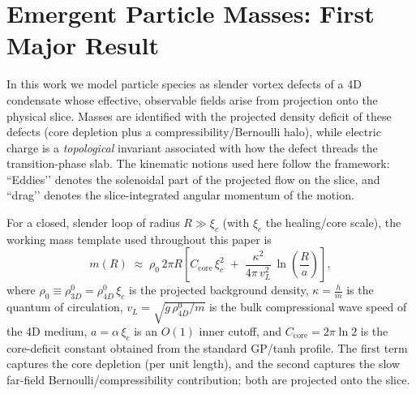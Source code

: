 \section{Emergent Particle Masses: First Major Result}\label{sec:emergent-particles}

\medskip

In this work we model particle species as slender vortex defects of a 4D condensate whose effective, observable fields arise from projection onto the physical slice. Masses are identified with the projected density deficit of these defects (core depletion plus a compressibility/Bernoulli halo), while electric charge is a \emph{topological} invariant associated with how the defect threads the transition-phase slab. The kinematic notions used here follow the framework: “Eddies’’ denotes the solenoidal part of the projected flow on the slice, and “drag’’ denotes the slice-integrated angular momentum of the motion.

For a closed, slender loop of radius $R\gg\xi_c$ (with $\xi_c$ the healing/core scale), the working mass template used throughout this paper is
\begin{equation}
\label{eq:mass-template}
m(R)\;\approx\;\rho_0\,2\pi R\left[
C_{\mathrm{core}}\,\xi_c^2\;+\;\frac{\kappa^2}{4\pi\,v_L^2}\,
\ln\!\left(\frac{R}{a}\right)\right],
\end{equation}
where $\rho_0\equiv \rho_{3D}^0=\rho_{4D}^0\,\xi_c$ is the projected background density, $\kappa=\frac{h}{m}$ is the quantum of circulation, $v_L=\sqrt{g\,\rho_{4D}^0/m}$ is the bulk compressional wave speed of the 4D medium, $a=\alpha\,\xi_c$ is an $O(1)$ inner cutoff, and $C_{\mathrm{core}}=2\pi\ln 2$ is the core-deficit constant obtained from the standard GP/tanh profile. The first term captures the core depletion (per unit length), and the second captures the slow far-field Bernoulli/compressibility contribution; both are projected onto the slice.

